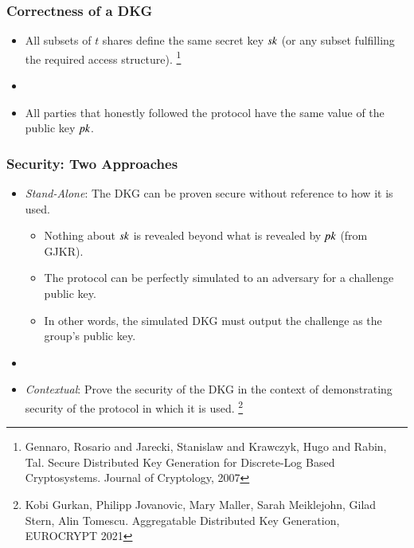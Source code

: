 \documentclass[hyperref={pdfpagelabels=true},table,dvipsnames,14pt,aspectratio=169]{beamer}
\begin{document}
\begin{frame}
  \frametitle{Correctness of a DKG}

  \begin{itemize}
    \item<1-> All subsets of $t$ shares define the same secret key $\mathit{sk}$ (or any subset fulfilling the required access structure).
\let\thefootnote\relax\footnote{
Gennaro, Rosario and Jarecki, Stanislaw and Krawczyk, Hugo and Rabin, Tal. Secure Distributed Key Generation for Discrete-Log Based Cryptosystems. Journal of Cryptology, 2007
}
    \item[]
    \item<2-> All parties that honestly followed the protocol have the same value of the public key $\mathit{pk}$.
  \end{itemize}
\end{frame}

\begin{frame}
  \frametitle{Security: Two Approaches}

  \begin{itemize}
    \item<1-> \emph{Stand-Alone}: The DKG can be proven secure without reference to how it is used.
    \begin{itemize}
      \item<2-> Nothing about $\mathit{sk}$ is revealed beyond what is revealed by $\mathit{pk}$ (from GJKR).
      \item<3-> The protocol can be perfectly simulated to an adversary for a challenge public key.
      \item<4-> In other words, the simulated DKG must output the challenge as the group's public key.
    \end{itemize}

    \item[]
    \item<5-> \emph{Contextual}: Prove the security of the DKG in the context of demonstrating security of the protocol in which it is used.
  \footnote{
  Kobi Gurkan, Philipp Jovanovic, Mary Maller, Sarah Meiklejohn, Gilad Stern, Alin Tomescu.
  Aggregatable Distributed Key Generation, EUROCRYPT 2021 }
  \end{itemize}
\end{frame}
\end{document}
